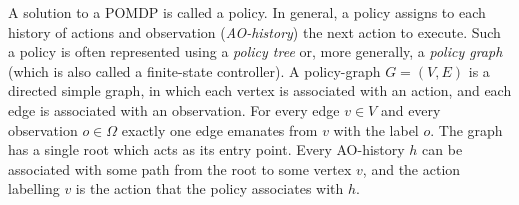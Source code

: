 \documentclass[letterpaper]{article} %
\begin{document}

A solution to a POMDP is called a policy. In general, a policy assigns to each history of actions and observation ({\em AO-history}) the next action to execute.
Such a policy is often represented using a {\em policy tree} or, more generally, a {\em policy graph} (which is also called a finite-state controller). 
A policy-graph $G=(V,E)$ is a directed simple graph, in which each vertex is associated with an action, and each edge is associated with an observation.
For every edge $v\in V$ and every observation $o\in\Omega$ exactly one edge emanates from $v$ with the label $o$.
The graph has a single root which acts as its entry point. Every AO-history $h$ can be associated with some path from the root to some vertex $v$,
and the action labelling $v$ is the action that the policy associates with $h$. 
\end{document}
